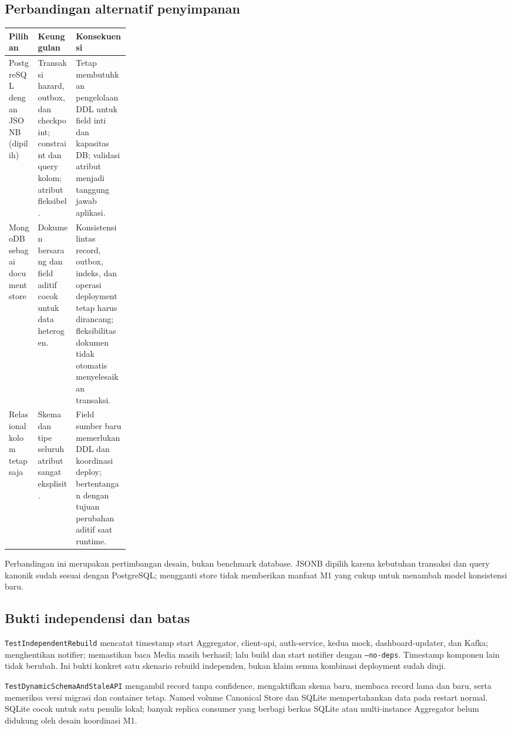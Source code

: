 \subsection{Perbandingan alternatif penyimpanan}
\begin{tabularx}{\linewidth}{P{0.24\linewidth}YY}
\toprule Pilihan & Keunggulan & Konsekuensi\\\midrule
PostgreSQL dengan JSONB (dipilih) & Transaksi hazard, outbox, dan checkpoint; constraint dan query kolom; atribut fleksibel. & Tetap membutuhkan pengelolaan DDL untuk field inti dan kapasitas DB; validasi atribut menjadi tanggung jawab aplikasi.\\
MongoDB sebagai document store & Dokumen bersarang dan field aditif cocok untuk data heterogen. & Konsistensi lintas record, outbox, indeks, dan operasi deployment tetap harus dirancang; fleksibilitas dokumen tidak otomatis menyelesaikan transaksi.\\
Relasional kolom tetap saja & Skema dan tipe seluruh atribut sangat eksplisit. & Field sumber baru memerlukan DDL dan koordinasi deploy; bertentangan dengan tujuan perubahan aditif saat runtime.\\
\bottomrule
\end{tabularx}
Perbandingan ini merupakan pertimbangan desain, bukan benchmark database. JSONB dipilih karena kebutuhan transaksi dan query kanonik sudah sesuai dengan PostgreSQL; mengganti store tidak memberikan manfaat M1 yang cukup untuk menambah model konsistensi baru.

\subsection{Bukti independensi dan batas}
\texttt{TestIndependentRebuild} mencatat timestamp start Aggregator, client-api, auth-service, kedua mock, dashboard-updater, dan Kafka; menghentikan notifier; memastikan baca Media masih berhasil; lalu build dan start notifier dengan \texttt{--no-deps}. Timestamp komponen lain tidak berubah. Ini bukti konkret satu skenario rebuild independen, bukan klaim semua kombinasi deployment sudah diuji.

\texttt{TestDynamicSchemaAndStaleAPI} mengambil record tanpa confidence, mengaktifkan skema baru, membaca record lama dan baru, serta memeriksa versi migrasi dan container tetap. Named volume Canonical Store dan SQLite mempertahankan data pada restart normal. SQLite cocok untuk satu penulis lokal; banyak replica consumer yang berbagi berkas SQLite atau multi-instance Aggregator belum didukung oleh desain koordinasi M1.
